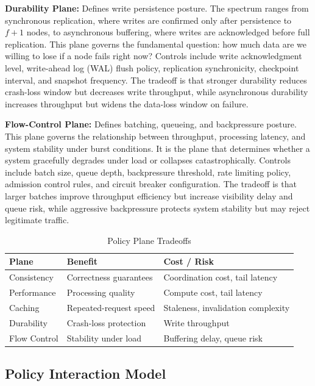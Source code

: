\documentclass[conference]{IEEEtran}
\begin{document}
\textbf{Durability Plane:} Defines write persistence posture. The spectrum ranges from synchronous replication, where writes are confirmed only after persistence to $f+1$ nodes, to asynchronous buffering, where writes are acknowledged before full replication. This plane governs the fundamental question: how much data are we willing to lose if a node fails right now? Controls include write acknowledgment level, write-ahead log (WAL) flush policy, replication synchronicity, checkpoint interval, and snapshot frequency. The tradeoff is that stronger durability reduces crash-loss window but decreases write throughput, while asynchronous durability increases throughput but widens the data-loss window on failure.

\textbf{Flow-Control Plane:} Defines batching, queueing, and backpressure posture. This plane governs the relationship between throughput, processing latency, and system stability under burst conditions. It is the plane that determines whether a system gracefully degrades under load or collapses catastrophically. Controls include batch size, queue depth, backpressure threshold, rate limiting policy, admission control rules, and circuit breaker configuration. The tradeoff is that larger batches improve throughput efficiency but increase visibility delay and queue risk, while aggressive backpressure protects system stability but may reject legitimate traffic.

\begin{table}[t]
\caption{Policy Plane Tradeoffs}
\label{tab:planes}
\centering
\small
\begin{tabular}{@{}l l l@{}}
\toprule
\textbf{Plane} & \textbf{Benefit} & \textbf{Cost / Risk} \\
\midrule
Consistency & Correctness guarantees & Coordination cost, tail latency \\
Performance & Processing quality & Compute cost, tail latency \\
Caching & Repeated-request speed & Staleness, invalidation complexity \\
Durability & Crash-loss protection & Write throughput \\
Flow Control & Stability under load & Buffering delay, queue risk \\
\bottomrule
\end{tabular}
\end{table}

\subsection{Policy Interaction Model}
\end{document}

